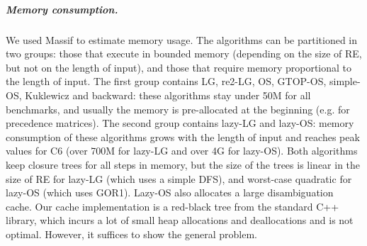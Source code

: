 \documentclass[AMA,STIX1COL]{WileyNJD-v2}
\begin{document}
\subparagraph{Memory consumption.}
We used Massif\cite{Massif} to estimate memory usage.
The algorithms can be partitioned in two groups:
those that execute in bounded memory (depending on the size of RE, but not on the length of input),
and those that require memory proportional to the length of input.
The first group contains LG, re2-LG, OS, GTOP-OS, simple-OS, Kuklewicz and backward:
these algorithms stay under 50M for all benchmarks,
and usually the memory is pre-allocated at the beginning (e.g. for precedence matrices).
The second group contains lazy-LG and lazy-OS:
memory consumption of these algorithms grows with the length of input
and reaches peak values for C6 (over 700M for lazy-LG and over 4G for lazy-OS).
Both algorithms keep closure trees for all steps in memory,
but the size of the trees is linear in the size of RE for lazy-LG (which uses a simple DFS),
and worst-case quadratic for lazy-OS (which uses GOR1).
Lazy-OS also allocates a large disambiguation cache.
Our cache implementation is a red-black tree from the standard C++ library,
which incurs a lot of small heap allocations and deallocations and is not optimal.
However, it suffices to show the general problem.
\end{document}
